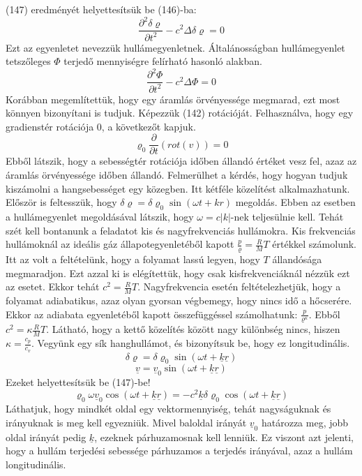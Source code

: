 \documentclass[a4paper,12pt]{article}
\begin{document}
(147) eredményét helyettesítsük be (146)-ba:
\begin{equation}
\frac{\partial^2\delta\varrho}{\partial t^2}-c^2\Delta\delta\varrho=0
\end{equation}
Ezt az egyenletet nevezzük hullámegyenletnek. Általánosságban hullámegyenlet tetszőleges $\Phi$ terjedő mennyiségre felírható hasonló alakban.
\begin{equation}
\frac{\partial^2\Phi}{\partial t^2}-c^2\Delta\Phi=0
\end{equation}
Korábban megemlítettük, hogy egy áramlás örvényessége megmarad, ezt most könnyen bizonyítani is tudjuk. Képezzük (142) rotációját. Felhasználva, hogy egy gradienstér rotációja 0, a következőt kapjuk.
\begin{equation}
\varrho_0\frac{\partial}{\partial t}(rot(v))=0
\end{equation}
Ebből látszik, hogy a sebességtér rotációja időben állandó értéket vesz fel, azaz az áramlás örvényessége időben állandó.
Felmerülhet a kérdés, hogy hogyan tudjuk kiszámolni a hangsebességet egy közegben. Itt kétféle közelítést alkalmazhatunk. Először is feltesszük, hogy $\delta\varrho=\delta\varrho_0\sin(\omega t+kr)$ megoldás. Ebben az esetben a hullámegyenlet megoldásával látszik, hogy $\omega=c|k|$-nek teljesülnie kell. Tehát szét kell bontanunk a feladatot kis és nagyfrekvenciás hullámokra. Kis frekvenciás hullámoknál az ideális gáz állapotegyenletéből kapott $\frac{p}{\varrho}=\frac{R}{M}T$ értékkel számolunk. Itt az volt a feltételünk, hogy a folyamat lassú legyen, hogy $T$ állandósága megmaradjon. Ezt azzal ki is elégítettük, hogy csak kisfrekvenciáknál nézzük ezt az esetet. Ekkor tehát $c^2=\frac{R}{M}T$.
Nagyfrekvencia esetén feltételezhetjük, hogy a folyamat adiabatikus, azaz olyan gyorsan végbemegy, hogy nincs idő a hőcserére. Ekkor az adiabata egyenletéből kapott összefüggéssel számolhatunk: $\frac{p}{\varrho^{\kappa}}$. Ebből $c^2=\kappa\frac{R}{M}T$. Látható, hogy a kettő közelítés között nagy különbség nincs, hiszen $\kappa=\frac{c_p}{c_v}$.
Vegyünk egy sík hanghullámot, és bizonyítsuk be, hogy ez longitudinális.
\begin{equation}
\delta\varrho=\delta\varrho_0\sin(\omega t+\underline{k}\underline{r})
\end{equation}
\begin{equation}
\underline{v}=\underline{v}_0\sin(\omega t+\underline{k}\underline{r})
\end{equation}
Ezeket helyettesítsük be (147)-be!
\begin{equation}
\varrho_0\omega\underline{v}_0\cos(\omega t+\underline{k}\underline{r})=-c^2\underline{k}\delta\varrho_0\cos(\omega t+\underline{k}\underline{r})
\end{equation}
Láthatjuk, hogy mindkét oldal egy vektormennyiség, tehát nagyságuknak és irányuknak is meg kell egyezniük. Mivel baloldal irányát $\underline{v}_0$ határozza meg, jobb oldal irányát pedig $\underline{k}$, ezeknek párhuzamosnak kell lenniük. Ez viszont azt jelenti, hogy a hullám terjedési sebessége párhuzamos a terjedés irányával, azaz a hullám longitudinális.
\end{document}
